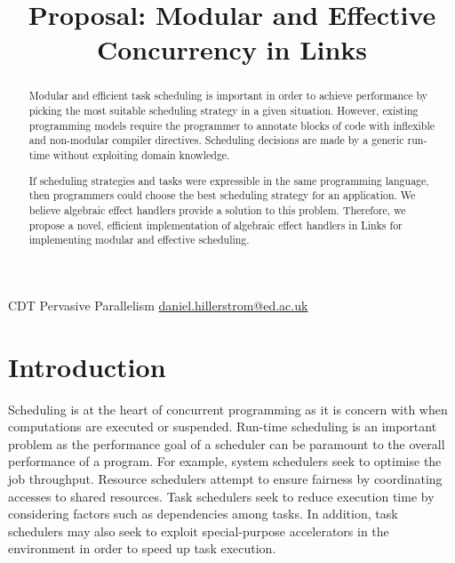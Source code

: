 \documentclass[preprint,10pt,numbers]{sigplanconf}
\begin{document}
\title{Proposal: Modular and Effective Concurrency in Links}

           {CDT Pervasive Parallelism}
           {\href{mailto:daniel.hillerstrom@ed.ac.uk}{daniel.hillerstrom@ed.ac.uk}}
  \maketitle
  \begin{abstract}
Modular and efficient task scheduling is important in order to achieve performance by picking the most suitable scheduling strategy in a given situation. However, existing programming models require the programmer to annotate blocks of code with inflexible and non-modular compiler directives. Scheduling decisions are made by a generic run-time without exploiting domain knowledge.

If scheduling strategies and tasks were expressible in the same programming language, then programmers could choose the best scheduling strategy for an application. We believe algebraic effect handlers provide a solution to this problem. Therefore, we propose a novel, efficient implementation of algebraic effect handlers in Links for implementing modular and effective scheduling.
  \end{abstract}
  \section{Introduction}
Scheduling is at the heart of concurrent programming as it is concern with when computations are executed or suspended. 
Run-time scheduling is an important problem as the performance goal of a scheduler can be paramount to the overall performance of a program. For example, system schedulers seek to optimise the job throughput. Resource schedulers attempt to ensure fairness by coordinating accesses to shared resources. Task schedulers seek to reduce execution time by considering factors such as dependencies among tasks. In addition, task schedulers may also seek to exploit special-purpose accelerators in the environment in order to speed up task execution.
\end{document}

